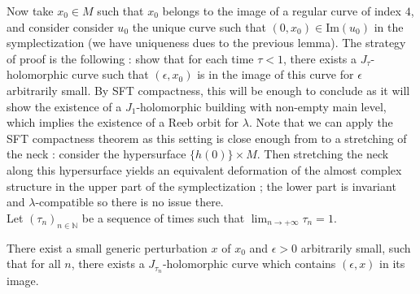 \documentclass[../main.tex]{subfiles}
\begin{document}
Now take $x_0\in M$ such that $x_0$ belongs to the image of a regular curve of index $4$, and consider consider $u_0$ the unique curve such that $(0,x_0)\in \text{Im}(u_0)$ in the symplectization (we have uniqueness dues to the previous lemma). The strategy of proof is the following : show that for each time $\tau <1 $, there exists a $J_\tau$-holomorphic curve such that $(\epsilon,x_0)$ is in the image of this curve for $\epsilon$ arbitrarily small. By SFT compactness, this will be enough to conclude as it will show the existence of a $J_1$-holomorphic building with non-empty main level, which implies the existence of a Reeb orbit for $\lambda$. Note that we can apply the SFT compactness theorem as this setting is close enough from to a stretching of the neck : consider the hypersurface $\{h(0)\}\times M$. Then stretching the neck along this hypersurface yields an equivalent deformation of the almost complex structure in the upper part of the symplectization ; the lower part is invariant and $\lambda$-compatible so there is no issue there. \\

Let $(\tau_n)_{n\in \mathbb{N}}$ be a sequence of times such that $\displaystyle\lim_{n\rightarrow +\infty}\tau_n = 1$.

\begin{proposition}
There exist a small generic perturbation $x$ of $x_0$ and $\epsilon > 0$ arbitrarily small, such that for all $n$, there exists a $J_{\tau_n}$-holomorphic curve which contains $(\epsilon,x)$ in its image.
\end{proposition}
\end{document}
